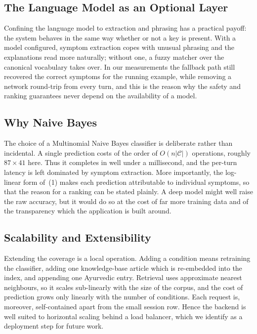 \documentclass[conference]{IEEEtran}
\begin{document}
\subsection{The Language Model as an Optional Layer}

Confining the language model to extraction and phrasing has a practical
payoff: the system behaves in the same way whether or not a key is present.
With a model configured, symptom extraction copes with unusual phrasing and
the explanations read more naturally; without one, a fuzzy matcher over the
canonical vocabulary takes over. In our measurements the fallback path still
recovered the correct symptoms for the running example, while removing a
network round-trip from every turn, and this is the reason why the safety and
ranking guarantees never depend on the availability of a model.

\subsection{Why Naive Bayes}

The choice of a Multinomial Naive Bayes classifier is deliberate rather than
incidental. A single prediction costs of the order of $O(n|\mathcal{C}|)$
operations, roughly $87 \times 41$ here. Thus it completes in well under a
millisecond, and the per-turn latency is left dominated by symptom
extraction. More importantly, the log-linear form of~(1) makes each prediction
attributable to individual symptoms, so that the reason for a ranking can be
stated plainly. A deep model might well raise the raw accuracy, but it would
do so at the cost of far more training data and of the transparency which the
application is built around.

\subsection{Scalability and Extensibility}

Extending the coverage is a local operation. Adding a condition means
retraining the classifier, adding one knowledge-base article which is
re-embedded into the index, and appending one Ayurvedic entry. Retrieval uses
approximate nearest neighbours, so it scales sub-linearly with the size of
the corpus, and the cost of prediction grows only linearly with the number of
conditions. Each request is, moreover, self-contained apart from the small
session row. Hence the backend is well suited to horizontal scaling behind a
load balancer, which we identify as a deployment step for future work.
\end{document}

